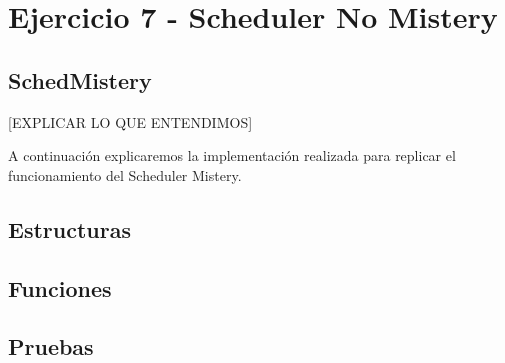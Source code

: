\section{Ejercicio 7 - Scheduler No Mistery}

\subsection{SchedMistery} 

[EXPLICAR LO QUE ENTENDIMOS]

A continuación explicaremos la implementación realizada para replicar el funcionamiento del Scheduler Mistery.

\subsection{Estructuras}

\subsection{Funciones}

\subsection{Pruebas}
